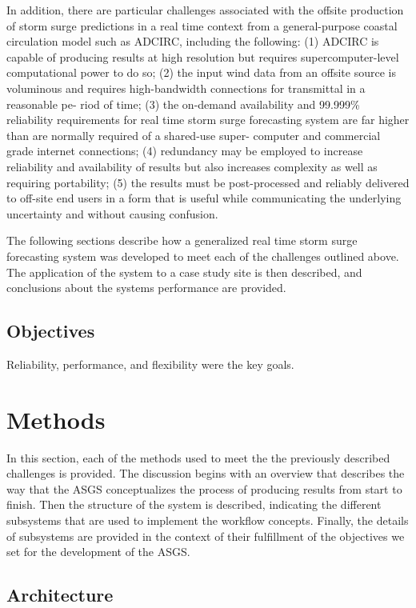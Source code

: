 \documentclass[12pt]{article}
\begin{document}
In addition, there are particular challenges associated with the 
offsite production of storm surge predictions in a real time context 
from a general-purpose coastal circulation model such as ADCIRC, 
including the following: (1) ADCIRC is capable of producing results 
at high resolution but requires supercomputer-level computational 
power to do so; (2) the input wind data from an offsite source is 
voluminous and requires high-bandwidth connections for transmittal 
in a reasonable pe- riod of time; (3) the on-demand availability and 
99.999\% reliability requirements for real time storm surge 
forecasting system are far higher than are normally required of a 
shared-use super- computer and commercial grade internet 
connections; (4) redundancy may be employed to increase reliability 
and availability of results but also increases complexity as well as 
requiring portability; (5) the results must be post-processed and 
reliably delivered to off-site end users in a form that is useful 
while communicating the underlying uncertainty and without causing 
confusion. 

The following sections describe how a generalized real time storm 
surge forecasting system was developed to meet each of the 
challenges outlined above. The application of the system to a case 
study site is then described, and conclusions about the systems 
performance are provided.

\subsection{Objectives}

Reliability, performance, and flexibility were the key goals. 

\section{Methods}

In this section, each of the methods used to meet the the previously 
described challenges is provided. The discussion begins with an 
overview that describes the way that the ASGS conceptualizes the 
process of producing results from start to finish. Then the 
structure of the system is described, indicating the different 
subsystems that are used to implement the workflow concepts. 
Finally, the details of subsystems are provided in the context of 
their fulfillment of the objectives we set for the development of 
the ASGS.  

\subsection{Architecture}
\end{document}
